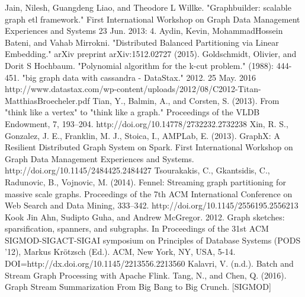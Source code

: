 \documentclass[12pt]{report}
\numberwithin{figure}{section}
\numberwithin{table}{section}
\begin{document}
\begin{thebibliography}{1}
   Jain, Nilesh, Guangdeng Liao, and Theodore L Willke. "Graphbuilder: scalable graph etl framework." First International Workshop on Graph Data Management Experiences and Systems 23 Jun. 2013: 4.
   Aydin, Kevin, MohammadHossein Bateni, and Vahab Mirrokni. "Distributed Balanced Partitioning via Linear Embedding." arXiv preprint arXiv:1512.02727 (2015).
   Goldschmidt, Olivier, and Dorit S Hochbaum. "Polynomial algorithm for the k-cut problem." (1988): 444-451.
   "big graph data with cassandra - DataStax." 2012. 25 May. 2016 http://www.datastax.com/wp-content/uploads/2012/08/C2012-Titan-MatthiasBroecheler.pdf
   Tian, Y., Balmin, A., and Corsten, S. (2013). From "think like a vertex" to "think like a graph." Proceedings of the VLDB Endowment, 7, 193–204. http://doi.org/10.14778/2732232.2732238
   Xin, R. S., Gonzalez, J. E., Franklin, M. J., Stoica, I.,  AMPLab, E. (2013). GraphX: A Resilient Distributed Graph System on Spark. First International Workshop on Graph Data Management Experiences and Systems. http://doi.org/10.1145/2484425.2484427
   Tsourakakis, C., Gkantsidis, C., Radunovic, B.,  Vojnovic, M. (2014). Fennel: Streaming graph partitioning for massive scale graphs. Proceedings of the 7th ACM International Conference on Web Search and Data Mining, 333–342. http://doi.org/10.1145/2556195.2556213
  Kook Jin Ahn, Sudipto Guha, and Andrew McGregor. 2012. Graph sketches: sparsification, spanners, and subgraphs. In Proceedings of the 31st ACM SIGMOD-SIGACT-SIGAI symposium on Principles of Database Systems (PODS '12), Markus Krötzsch (Ed.). ACM, New York, NY, USA, 5-14. DOI=http://dx.doi.org/10.1145/2213556.2213560
   Kalavri, V. (n.d.). Batch and Stream Graph Processing with Apache Flink.
   Tang, N., and Chen, Q. (2016). Graph Stream Summarization From Big Bang to Big Crunch. [SIGMOD]
  
  
  
\end{thebibliography}
\end{document}
